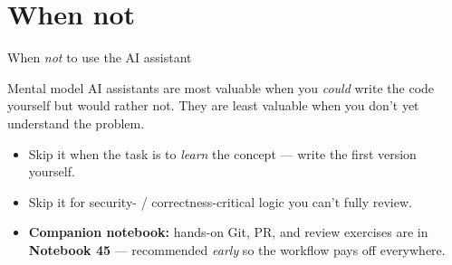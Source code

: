 \documentclass[aspectratio=169,11pt]{beamer}
\begin{document}
\section{When not}
\begin{frame}{When \emph{not} to use the AI assistant}
  \begin{exampleblock}{Mental model}
    AI assistants are most valuable when you \emph{could} write the code yourself but would rather not. They are least valuable when you don't yet understand the problem.
  \end{exampleblock}
  \begin{itemize}
    \item Skip it when the task is to \emph{learn} the concept --- write the first version yourself.
    \item Skip it for security- / correctness-critical logic you can't fully review.
    \item \textbf{Companion notebook:} hands-on Git, PR, and review exercises are in \textbf{Notebook 45} --- recommended \emph{early} so the workflow pays off everywhere.
  \end{itemize}
\end{frame}
\end{document}
